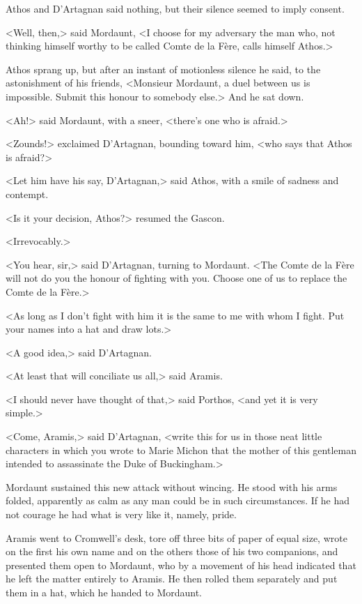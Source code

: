 Athos and D'Artagnan said nothing, but their silence seemed to imply consent.

<Well, then,> said Mordaunt, <I choose for my adversary the man who, not thinking himself worthy to be called Comte de la Fère, calls himself Athos.>

Athos sprang up, but after an instant of motionless silence he said, to the astonishment of his friends, <Monsieur Mordaunt, a duel between us is impossible. Submit this honour to somebody else.> And he sat down.

<Ah!> said Mordaunt, with a sneer, <there's one who is afraid.>

<Zounds!> exclaimed D'Artagnan, bounding toward him, <who says that Athos is afraid?>

<Let him have his say, D'Artagnan,> said Athos, with a smile of sadness and contempt.

<Is it your decision, Athos?> resumed the Gascon.

<Irrevocably.>

<You hear, sir,> said D'Artagnan, turning to Mordaunt. <The Comte de la Fère will not do you the honour of fighting with you. Choose one of us to replace the Comte de la Fère.>

<As long as I don't fight with him it is the same to me with whom I fight. Put your names into a hat and draw lots.>

<A good idea,> said D'Artagnan.

<At least that will conciliate us all,> said Aramis.

<I should never have thought of that,> said Porthos, <and yet it is very simple.>

<Come, Aramis,> said D'Artagnan, <write this for us in those neat little characters in which you wrote to Marie Michon that the mother of this gentleman intended to assassinate the Duke of Buckingham.>

Mordaunt sustained this new attack without wincing. He stood with his arms folded, apparently as calm as any man could be in such circumstances. If he had not courage he had what is very like it, namely, pride.

Aramis went to Cromwell's desk, tore off three bits of paper of equal size, wrote on the first his own name and on the others those of his two companions, and presented them open to Mordaunt, who by a movement of his head indicated that he left the matter entirely to Aramis. He then rolled them separately and put them in a hat, which he handed to Mordaunt.

